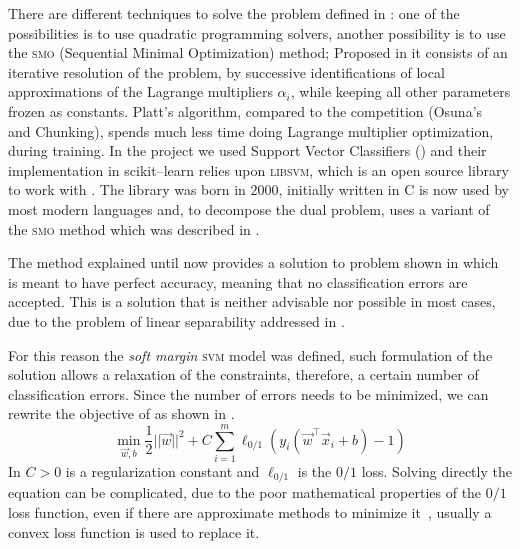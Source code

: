 There are different techniques to solve the problem defined in : one of the possibilities is to use quadratic
programming solvers, another possibility is to use the \textsc{smo} (Sequential Minimal Optimization) method; Proposed in
\cite{platt1998} it consists of an iterative resolution of the problem, by successive
identifications of local approximations of the Lagrange multipliers $\alpha_i$, while keeping all
other parameters frozen as constants. Platt's algorithm, compared to the competition
(Osuna's~\cite{osuna1997} and Chunking), spends much less time doing Lagrange multiplier
optimization, during training. In the project we used Support Vector Classifiers (\svcs) and their implementation in
scikit--learn relies upon \textsc{libsvm}, which is an open source library to work with \svms. The
library was born in $2000$, initially written in C\+\+ is now used by most modern languages and, to decompose the dual problem, uses a variant of the \textsc{smo} method which was described in \cite{fang2005}.

\medskip

The method explained until now provides a solution to problem shown in  which is meant to
have perfect accuracy, meaning that no classification errors are accepted. This is a solution that
is neither advisable nor possible in most cases, due to the problem of linear separability addressed
in .

For this reason the \emph{soft margin} \textsc{svm} model was defined, such formulation of the solution
allows a relaxation of the constraints, therefore, a certain number of classification errors.
Since the number of errors needs to be minimized, we can rewrite the objective of  as
shown in .
\begin{equation}
	\label{eq:sm-primal}
	\min_{\vec{w}, b} \frac{1}{2}||\vec{w}||^2 + C\sum_{i = 1}^m \ell_{0 / 1}(y_i (\vec{w}^\top \vec{x}_i + b) - 1)
\end{equation}
In  $C > 0$ is a regularization constant and $\ell_{0 / 1}$ is the $0/1$
loss. Solving directly the equation can be complicated, due to the poor mathematical properties of
the $0/1$ loss function, even if there are approximate methods to minimize it~\cite{nguyen2013},
usually a convex loss function is used to replace it.

